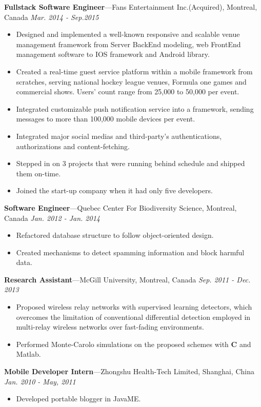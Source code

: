 \documentclass[11pt]{article}
\newenvironment{changemargin}[2]{%
  \begin{list}{}{%
    \setlength{\topsep}{0pt}%
    \setlength{\leftmargin}{#1}%
    \setlength{\rightmargin}{#2}%
    \setlength{\listparindent}{\parindent}%
    \setlength{\itemindent}{\parindent}%
    \setlength{\parsep}{\parskip}%
  }%
  \item[]}{\end{list}
}
\newenvironment{body} {
	\vspace*{-16pt}
	\begin{changemargin}{-0.25in}{-0.5in}
  }	
	{\end{changemargin}
}
\begin{document}
\begin{body}
	\vspace{14pt}
	\textbf{Fullstack Software Engineer}---Fans Entertainment Inc.(Acquired), Montreal, Canada  \hfill \emph{Mar. 2014 - Sep.2015}\\
	\begin{itemize} \itemsep -0pt  %
		\item Designed and implemented a well-known responsive and scalable venue management framework from Server BackEnd modeling, web FrontEnd management software to IOS framework and Android library.
		\item Created a real-time guest service platform within a mobile framework from scratches, serving national hockey league venues, Formula one games and commercial shows. Users' count range from 25,000 to 50,000 per event.
		\item Integrated customizable push notification service into a framework, sending messages to more than 100,000 mobile devices per event.
		\item Integrated major social medias and third-party's authentications, authorizations and content-fetching.
		\item Stepped in on 3 projects that were running behind schedule and shipped them on-time.
		\item Joined the start-up company when it had only five developers.
	\end{itemize}

	\textbf{Software Engineer}---Quebec Center For Biodiversity Science, Montreal, Canada  \hfill \emph{Jan. 2012 - Jan. 2014}\\
	\begin{itemize} \itemsep -0pt  %
		\item Refactored database structure to follow object-oriented design.
		\item Created mechanisms to detect spamming information and block harmful data.
	\end{itemize}	
	
	\textbf{Research Assistant}---McGill University, Montreal, Canada  \hfill \emph{Sep. 2011 - Dec. 2013}\\
	\vspace*{-4pt}
	\begin{itemize} \itemsep -0pt  %
\item Proposed wireless relay networks with supervised learning detectors, which overcomes the limitation of conventional differential detection employed in multi-relay wireless networks over fast-fading environments. 
\item Performed Monte-Carolo simulations on the proposed schemes with \textbf{C} and Matlab.
	\end{itemize}

	\textbf{Mobile Developer Intern}---Zhongshu Health-Tech Limited, Shanghai, China \hfill \emph{Jan. 2010 - May, 2011}\\
	\begin{itemize} \itemsep -0pt  %
		\item Developed portable blogger in JavaME.
	\end{itemize}
\end{body}
\end{document}

